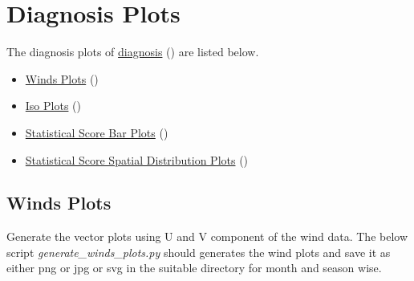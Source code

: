 \documentclass[letterpaper,10pt,english]{sphinxmanual}
\begin{document}
\section{Diagnosis Plots}
\label{diagnosis:diagnosis-plots}
The diagnosis plots of {\hyperref[diagnosis:diagnosis]{diagnosis}} () are listed below.
\begin{itemize}
\item {} 
{\hyperref[diagnosis:winds-plots]{Winds Plots}} ()

\item {} 
{\hyperref[diagnosis:iso-plots]{Iso Plots}} ()

\item {} 
{\hyperref[diagnosis:statistical-score-bar-plots]{Statistical Score Bar Plots}} ()

\item {} 
{\hyperref[diagnosis:statistical-score-spatial-distribution-plots]{Statistical Score Spatial Distribution Plots}} ()

\end{itemize}


\subsection{Winds Plots}
\label{diagnosis:winds-plots}
Generate the vector plots using U and V component of the wind data.
The below script \emph{generate\_winds\_plots.py} should generates the wind plots and save it as either png or jpg or svg in the suitable directory for month and season wise.
\label{diagnosis:module-generate_winds_plots}
\end{document}
